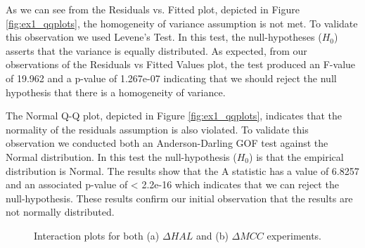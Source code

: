 \documentclass[10pt,nocc]{xrese_report}
\begin{document}
As we can see from the Residuals vs. Fitted plot, depicted in Figure \ref{fig:ex1_qqplots}, the homogeneity of variance assumption is not met. To validate this observation we used Levene's Test. In this test, the null-hypotheses ($H_0$) asserts that the variance is equally distributed. As expected, from our observations of the Residuals vs Fitted Values plot, the test produced an F-value of 19.962 and a p-value of 1.267e-07 indicating that we should reject the null hypothesis that there is a homogeneity of variance.

The Normal Q-Q plot, depicted in Figure \ref{fig:ex1_qqplots}, indicates that the normality of the residuals assumption is also violated. To validate this observation we conducted both an Anderson-Darling GOF test against the Normal distribution. In this test the null-hypothesis ($H_0$) is that the empirical distribution is Normal. The results show that the A statistic has a value of 6.8257 and an associated p-value of < 2.2e-16 which indicates that we can reject the null-hypothesis. These results confirm our initial observation that the results are not normally distributed.

\begin{figure}[tb]
 \centering
 \caption{Interaction plots for both (a) $\Delta HAL$ and (b) $\Delta MCC$ experiments.}
\end{figure}
\end{document}
